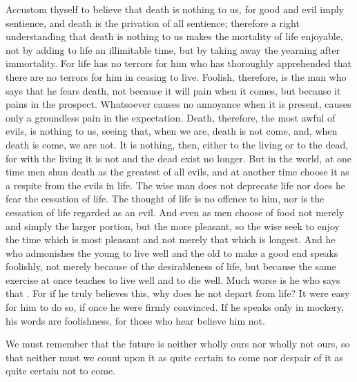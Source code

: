 \documentclass{stex}
\begin{document}
Accustom thyself to believe that death is nothing to us, for good and evil imply sentience, and death is the privation of all sentience; therefore a right understanding that death is nothing to us makes the mortality of life enjoyable, not by adding to life an illimitable time, but by taking away the yearning after immortality.
For life has no terrors for him who has thoroughly apprehended that there are no terrors for him in ceasing to live.
Foolish, therefore, is the man who says that he fears death, not because it will pain when it comes, but because it pains in the prospect.
Whatsoever causes no annoyance when it is present, causes only a groundless pain in the expectation.
Death, therefore, the most awful of evils, is nothing to us, seeing that, when we are, death is not come, and, when death is come, we are not.
It is nothing, then, either to the living or to the dead, for with the living it is not and the dead exist no longer. But in the world, at one time men shun death as the greatest of all evils, and at another time choose it as a respite from the evils in life.
The wise man does not deprecate life nor does he fear the cessation of life.
The thought of life is no offence to him, nor is the cessation of life regarded as an evil.
And even as men choose of food not merely and simply the larger portion, but the more pleasant, so the wise seek to enjoy the time which is most pleasant and not merely that which is longest.
And he who admonishes the young to live well and the old to make a good end speaks foolishly, not merely because of the desirableness of life, but because the same exercise at once teaches to live well and to die well.
Much worse is he who says that .
For if he truly believes this, why does he not depart from life? It were easy for him to do so, if once he were firmly convinced.
If he speaks only in mockery, his words are foolishness, for those who hear believe him not.

We must remember that the future is neither wholly ours nor wholly not ours, so that neither must we count upon it as quite certain to come nor despair of it as quite certain not to come.
\end{document}
